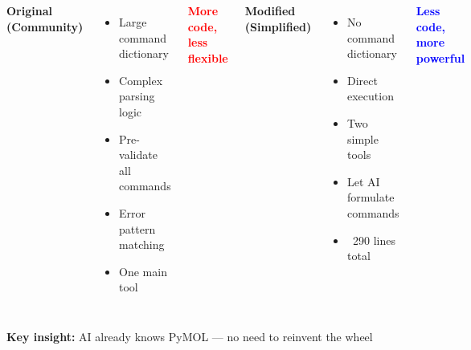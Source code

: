 \documentclass[aspectratio=169]{beamer}
\begin{document}
\begin{frame}

\vspace{0.3cm}

\begin{columns}[t]

\centering
\textbf{\large Original (Community)}
\vspace{0.3cm}

\normalsize
\begin{itemize}
\item Large command dictionary
\item Complex parsing logic
\item Pre-validate all commands
\item Error pattern matching
\item One main tool
\end{itemize}

\vspace{0.5cm}
\textcolor{red}{\textbf{More code, less flexible}}

\centering
\textbf{\large Modified (Simplified)}
\vspace{0.3cm}

\normalsize
\begin{itemize}
\item No command dictionary
\item Direct execution
\item Two simple tools
\item Let AI formulate commands
\item ~290 lines total
\end{itemize}

\vspace{0.5cm}
\textcolor{blue}{\textbf{Less code, more powerful}}

\end{columns}

\vspace{0.8cm}
\centering
\large
\textbf{Key insight:} AI already knows PyMOL — no need to reinvent the wheel

\end{frame}
\end{document}
